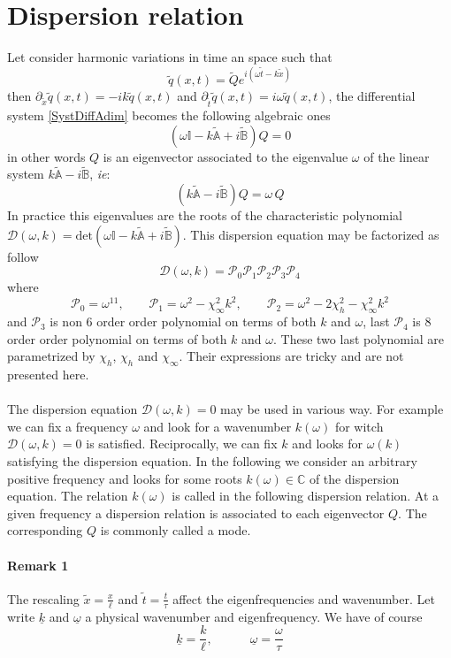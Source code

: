 \documentclass[
10pt, %
a4paper, %
oneside, %
headinclude,footinclude, %
table
]{scrartcl}
\begin{document}
\section{Dispersion relation}
Let consider harmonic variations in time an space such that 
$$
\tilde{q}(x,t)=\tilde{Q}e^{i(\omega \tilde{t}-k\tilde{x})}
$$
then $\partial_{\tilde{x}}\tilde{q}(x,t)=-ik\tilde{q}(x,t)$ and $\partial_{\tilde{t}}\tilde{q}(x,t)=i\omega\tilde{q}(x,t)$, the differential system \ref{SystDiffAdim} becomes the following algebraic ones
\begin{equation}\label{SystDiffAdim}
\left(\omega\mathbb{I} -k\tilde{\mathbb{A}}+i\tilde{\mathbb{B}}\right)Q=0
\end{equation}
in other words $Q$ is an eigenvector associated to the eigenvalue $\omega$ of the linear system $k\tilde{\mathbb{A}}-i\tilde{\mathbb{B}}$, \textit{ie}:
$$
\left(k\tilde{\mathbb{A}}-i\tilde{\mathbb{B}}\right)Q=\omega \, Q
$$
In practice this eigenvalues are the roots of the characteristic polynomial $\mathcal{D}(\omega,k)=\textrm{det}(\omega\mathbb{I} -k\tilde{\mathbb{A}}+i\tilde{\mathbb{B}})$. This dispersion equation may be factorized as follow
$$
\mathcal{D}(\omega,k)=\mathcal{P}_{0}\mathcal{P}_{1}\mathcal{P}_{2}\mathcal{P}_{3}\mathcal{P}_{4}
$$
where 
$$
\mathcal{P}_{0}=\omega^{11}, \quad\quad
\mathcal{P}_{1}=\omega^2-\chi_{\infty}^2k^2, \quad\quad
\mathcal{P}_{2}=\omega^2-2 \chi_{h}^2-\chi_{\infty}^2k^2
$$
and $\mathcal{P}_{3}$ is non 6 order order polynomial on terms of both $k$ and $\omega$, last $\mathcal{P}_{4}$  is 8 order order polynomial on terms of both $k$ and $\omega$. These two last polynomial are parametrized by $\chi_{h}$, $\chi_{h}$ and $\chi_{\infty}$. Their expressions are tricky and are not presented here. \\
\\
The dispersion equation $\mathcal{D}(\omega,k)=0$ may be used in various way. For example we can fix a frequency $\omega$ and look for a wavenumber $k(\omega)$ for witch $\mathcal{D}(\omega,k)=0$ is satisfied. Reciprocally, we can fix $k$ and looks for $\omega(k)$ satisfying the dispersion equation. In the following we consider an arbitrary positive frequency and looks for some roots $k(\omega)\in \mathbb{C}$ of the dispersion equation.  The relation $k(\omega)$ is called in the following dispersion relation. At a given frequency a dispersion relation is associated to each eigenvector $Q$. The corresponding $Q$ is commonly called a mode. \\
\paragraph{\textbf{Remark 1}} The rescaling $\tilde{x}=\frac{x}{\ell}$ and $\tilde{t}=\frac{t}{\tau}$ affect the eigenfrequencies and wavenumber. Let write $\underline{k}$ and $\underline{\omega}$ a physical wavenumber and eigenfrequency.  We have of course 
$$
\underline{k}=\frac{k}{\ell}, \quad\quad\quad
\underline{\omega}=\frac{\omega}{\tau}
$$
\end{document}
